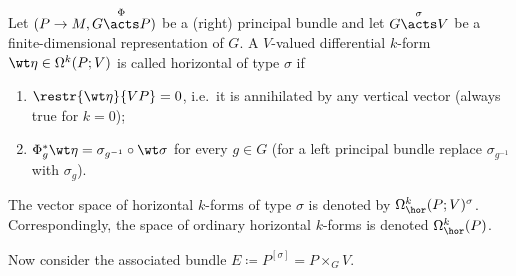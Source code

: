 \begin{defn}
    Let $(P\to M,G\overset{\Phi}{\acts} P)$ be a (right) principal bundle and let $G\overset{\sigma}{\acts}V$ be a finite-dimensional representation of $G$. A $V$-valued differential $k$-form $\wt\eta\in\Omega^k(P;V)$ is called horizontal of type $\sigma$ if
    \begin{enumerate}
        \item $\restr{\wt\eta}{VP}=0$, i.e.\ it is annihilated by any vertical vector (always true for $k=0$);
        \item $\Phi_g^\ast \wt\eta=\sigma_{g^{-1}}\circ\wt\sigma$ for every $g\in G$ (for a left principal bundle replace $\sigma_{g^{-1}}$ with $\sigma_g$).
    \end{enumerate}
    The vector space of horizontal $k$-forms of type $\sigma$ is denoted by $\Omega^k_{\hor}(P;V)^\sigma$. Correspondingly, the space of ordinary horizontal $k$-forms is denoted $\Omega^k_{\hor}(P)$. 
\end{defn}

Now consider the associated bundle $E\coloneqq P^{[\sigma]}=P\times_G V$.


